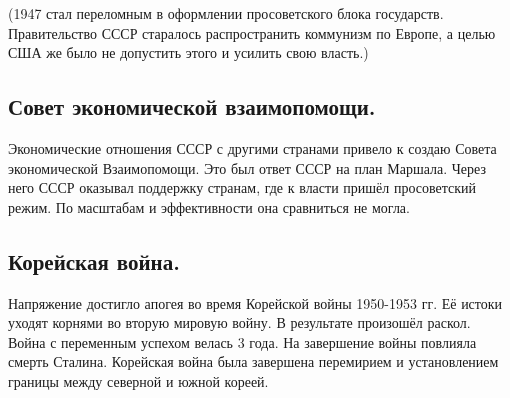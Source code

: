 (1947 стал переломным в оформлении просоветского блока государств. Правительство СССР старалось распространить коммунизм по Европе, а целью США же было не допустить этого и усилить свою власть.)

\subsection{Совет экономической взаимопомощи.}

Экономические отношения СССР с другими странами привело к создаю Совета экономической Взаимопомощи. Это был ответ СССР на план Маршала. Через него СССР оказывал поддержку странам, где к власти пришёл просоветский режим. По масштабам и эффективности она сравниться не могла.

\subsection{Корейская война.}

Напряжение достигло апогея во время Корейской войны 1950-1953 гг. Её истоки уходят корнями во вторую мировую войну. В результате произошёл раскол. Война с переменным успехом велась 3 года. На завершение войны повлияла смерть Сталина. Корейская война была завершена перемирием и установлением границы между северной и южной кореей.